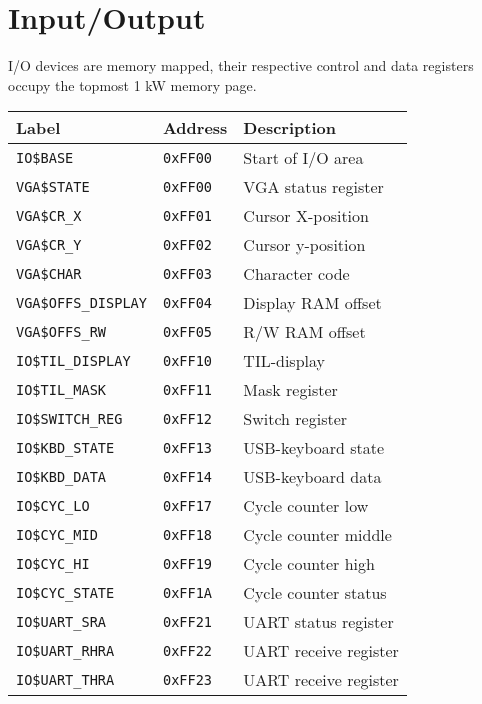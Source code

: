\documentclass{leaflet}
\begin{document}
 \section{Input/Output}
  I/O devices are memory mapped, their respective control and data registers 
  occupy the topmost 1 kW memory page.
\pagebreak
  {\scriptsize
   \begin{center}
    \begin{longtable}{|l|l|l|}
     \hline
     Label&Address&Description\\
     \hline
     \hline
     \texttt{IO\$BASE}&\texttt{0xFF00}&Start of I/O area\\
     \hline
     \texttt{VGA\$STATE}&\texttt{0xFF00}&VGA status register\\
     \texttt{VGA\$CR\_X}&\texttt{0xFF01}&Cursor X-position\\
     \texttt{VGA\$CR\_Y}&\texttt{0xFF02}&Cursor y-position\\
     \texttt{VGA\$CHAR}&\texttt{0xFF03}&Character code\\
     \texttt{VGA\$OFFS\_DISPLAY}&\texttt{0xFF04}&Display RAM offset\\
     \texttt{VGA\$OFFS\_RW}&\texttt{0xFF05}&R/W RAM offset\\
     \hline
     \texttt{IO\$TIL\_DISPLAY}&\texttt{0xFF10}&TIL-display\\
     \texttt{IO\$TIL\_MASK}&\texttt{0xFF11}&Mask register\\
     \hline
     \texttt{IO\$SWITCH\_REG}&\texttt{0xFF12}&Switch register\\
     \hline
     \texttt{IO\$KBD\_STATE}&\texttt{0xFF13}&USB-keyboard state\\
     \texttt{IO\$KBD\_DATA}&\texttt{0xFF14}&USB-keyboard data\\
     \hline
     \texttt{IO\$CYC\_LO}&\texttt{0xFF17}&Cycle counter low\\
     \texttt{IO\$CYC\_MID}&\texttt{0xFF18}&Cycle counter middle\\
     \texttt{IO\$CYC\_HI}&\texttt{0xFF19}&Cycle counter high\\
     \texttt{IO\$CYC\_STATE}&\texttt{0xFF1A}&Cycle counter status\\
     \hline
     \texttt{IO\$UART\_SRA}&\texttt{0xFF21}&UART status register\\
     \texttt{IO\$UART\_RHRA}&\texttt{0xFF22}&UART receive register\\
     \texttt{IO\$UART\_THRA}&\texttt{0xFF23}&UART receive register\\
     \hline
    \end{longtable}
   \end{center}
  }
%
\end{document}
